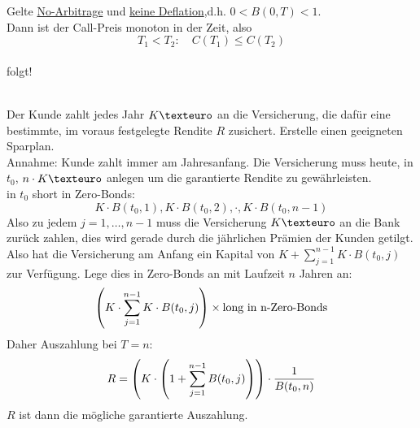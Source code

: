 Gelte \uline{No-Arbitrage} und \uline{keine Deflation},d.h. $0<B(0,T)<1$.\\
Dann ist der Call-Preis monoton in der Zeit, also \[ T_1<T_2:\quad C(T_1)\le C(T_2) \]
\\
folgt!

\\
Der Kunde zahlt jedes Jahr $K \texteuro$ an die Versicherung, die dafür eine bestimmte, im voraus festgelegte Rendite $R$ zusichert. Erstelle einen geeigneten Sparplan.\\
Annahme: Kunde zahlt immer am Jahresanfang. Die Versicherung muss heute, in $t_0$, $n\cdot K \texteuro$ anlegen um die garantierte Rendite zu gewährleisten.\\
in $t_0$ short in Zero-Bonds: \[ K\cdot B(t_0,1), K\cdot B(t_0,2), \cdot, K\cdot B(t_0,n-1) \]
Also zu jedem $j=1,\dots,n-1$ muss die Versicherung $K\texteuro$ an die Bank zurück zahlen, dies wird gerade durch die jährlichen Prämien der Kunden getilgt.\\
Also hat die Versicherung am Anfang ein Kapital von $K+\sum_{j=1}^{n-1}K\cdot B(t_0,j)$ zur Verfügung. Lege dies in Zero-Bonds an mit Laufzeit $n$ Jahren an: \[ \left( K\cdot \sum_{j=1}^{n-1}K\cdot B(t_0,j)\right)\times \text{long in n-Zero-Bonds} \]
Daher Auszahlung bei $T=n$: \[ R=\left( K\cdot \left( 1+\sum_{j=1}^{n-1}B(t_0,j)\right)\right)\cdot \frac{1}{B(t_0,n)} \]
$R$ ist dann die mögliche garantierte Auszahlung.


\cleardoubleoddemptypage
{}
\setcounter{page}{1}


\printindex
\listoffigures
